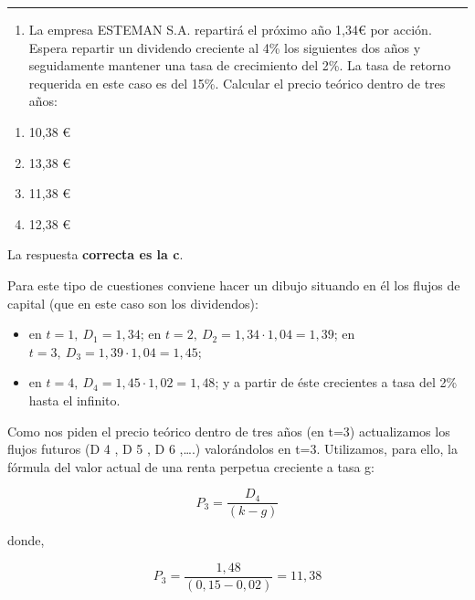\documentclass[
  letterpaper,
  DIV=11,
  numbers=noendperiod]{scrreprt}
\providecommand{\tightlist}{%
  \setlength{\itemsep}{0pt}\setlength{\parskip}{0pt}}\usepackage{longtable,booktabs,array}
\begin{document}
\begin{center}\rule{0.5\linewidth}{0.5pt}\end{center}

\begin{enumerate}
\def\labelenumi{\arabic{enumi}.}
\setcounter{enumi}{79}
\tightlist
\item
  La empresa ESTEMAN S.A. repartirá el próximo año 1,34€ por acción.
  Espera repartir un dividendo creciente al 4\% los siguientes dos años
  y seguidamente mantener una tasa de crecimiento del 2\%. La tasa de
  retorno requerida en este caso es del 15\%. Calcular el precio teórico
  dentro de tres años:
\end{enumerate}

\begin{enumerate}
\def\labelenumi{\alph{enumi}.}
\item
  10,38 €
\item
  13,38 €
\item
  11,38 €
\item
  12,38 €
\end{enumerate}

\begin{tcolorbox}[enhanced jigsaw, left=2mm, opacityback=0, colback=white, breakable, arc=.35mm, bottomrule=.15mm, rightrule=.15mm, toprule=.15mm, leftrule=.75mm, colframe=quarto-callout-tip-color-frame]
\begin{minipage}[t]{5.5mm}
\textcolor{quarto-callout-tip-color}{\faLightbulb}
\end{minipage}%
\begin{minipage}[t]{\textwidth - 5.5mm}

La respuesta \textbf{correcta es la c}.

Para este tipo de cuestiones conviene hacer un dibujo situando en él los
flujos de capital (que en este caso son los dividendos):

\begin{itemize}
\item
  en \(t=1,\ D_1 =1,34\); en \(t=2,\ D_2 =1,34\cdot 1,04 =1,39\); en
  \(t=3,\ D_3 =1,39 \cdot 1,04=1,45\);
\item
  en \(t=4,\ D_4 =1,45 \cdot 1,02=1,48\); y a partir de éste crecientes
  a tasa del 2\% hasta el infinito.
\end{itemize}

Como nos piden el precio teórico dentro de tres años (en t=3)
actualizamos los flujos futuros (D 4 , D 5 , D 6 ,\ldots.) valorándolos
en t=3. Utilizamos, para ello, la fórmula del valor actual de una renta
perpetua creciente a tasa g:

\[P_3 = \frac{D_4}{(k-g)} \]

donde,

\[P_3 = \frac{1,48}{(0,15-0,02)} = 11,38\]

\end{minipage}%
\end{tcolorbox}
\end{document}
